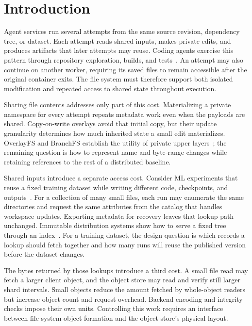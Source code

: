 \section{Introduction}
\label{sec:intro}

Agent services run several attempts from the same source revision,
dependency tree, or dataset. Each attempt reads shared inputs, makes
private edits, and produces artifacts that later attempts may reuse.
Coding agents exercise this pattern through repository exploration,
builds, and tests~\cite{sweagent2024,openhands2025}. An attempt may also
continue on another worker, requiring its saved files to remain
accessible after the original container exits. The file system must
therefore support both isolated modification and repeated access to
shared state throughout execution.

Sharing file contents addresses only part of this cost. Materializing
a private namespace for every attempt repeats metadata work even when
the payloads are shared. Copy-on-write overlays avoid that initial copy,
but their update granularity determines how much inherited state a
small edit materializes. OverlayFS and BranchFS establish the utility
of private upper layers~\cite{overlayfs,branchfs2026}; the remaining
question is how to represent name and byte-range changes while retaining
references to the rest of a distributed baseline.

Shared inputs introduce a separate access cost. Consider ML experiments
that reuse a fixed training dataset while writing different code,
checkpoints, and outputs~\cite{mlebench2025}. For a collection of many
small files, each run may enumerate the same directories and request
the same attributes from the catalog that handles workspace updates.
Exporting metadata for recovery leaves that lookup path unchanged.
Immutable distribution systems show how to serve a fixed tree through
an index~\cite{cvmfs2011,nydus_rafs,cofs2026}. For a training dataset,
the design question is which records a lookup should fetch together and
how many runs will reuse the published version before the dataset changes.

The bytes returned by those lookups introduce a third cost. A small
file read may fetch a larger client object, and the object store may
read and verify still larger shard intervals. Small objects reduce
the amount fetched by whole-object readers but increase object count
and request overhead. Backend encoding and integrity checks impose
their own units. Controlling this work requires an interface between
file-system object formation and the object store's physical layout.

